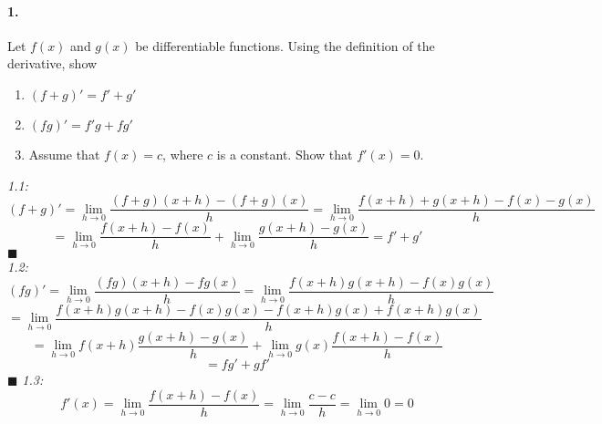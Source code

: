 \documentclass[10pt,a4paper]{article}
\begin{document}
\paragraph{1.} Let $f(x)$ and $g(x)$ be differentiable functions. Using the definition of the derivative, show 
\begin{enumerate}
\item $(f+g)' = f'+g'$
\item $(fg)' = f'g + fg'$
\item Assume that $f(x) = c$, where $c$ is a constant. Show that $f'(x) = 0$.
\end{enumerate}
\begin{flushleft}
\textit{1.1:}\\
$$(f+g)'  =  \lim_{h \to 0} \frac{(f+g)(x+h)-(f+g)(x)}{h} = \lim_{h \to 0} \frac{f(x+h)+g(x+h)-f(x)-g(x)}{h}$$
$$ = \lim_{h \to 0} \frac{f(x+h)-f(x)}{h}+ \lim_{h \to 0} \frac{g(x+h)-g(x)}{h} = f'+g'$$
$\blacksquare$\\
\textit{1.2:}\\
$$ (fg)' = \lim_{h \to 0} \frac{(fg)(x+h) - fg(x)}{h} = \lim_{h \to 0} \frac{f(x+h)g(x+h) - f(x)g(x)}{h}$$
$$  = \lim_{h \to 0} \frac{f(x+h)g(x+h) - f(x)g(x)-f(x+h)g(x)+f(x+h)g(x)}{h} $$
$$ = \lim_{h \to 0} f(x+h)\frac{g(x+h)-g(x)}{h} + \lim_{h \to 0} g(x) \frac{f(x+h)-f(x)}{h}$$
$$  = fg' + gf'$$
$\blacksquare$
\textit{1.3:}\\
$$f'(x) = \lim_{h \to 0} \frac{f(x+h)-f(x)}{h} = \lim_{h \to 0} \frac{c-c}{h} = \lim_{h \to 0} 0 = 0$$

\end{flushleft}
\end{document}
